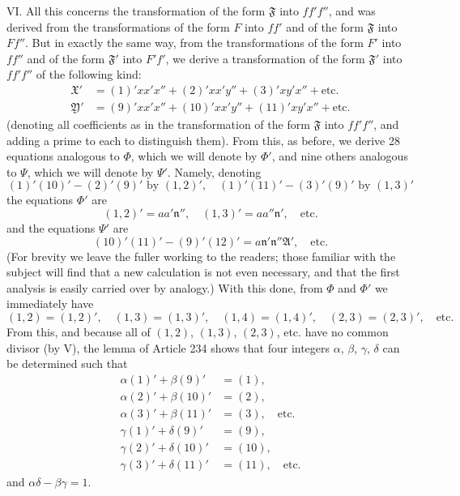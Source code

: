 VI. All this concerns the transformation of the form $\mathfrak{F}$ into $ff'f''$, and was derived from the transformations of the form $F$ into $ff'$ and of the form $\mathfrak{F}$ into $Ff''$. But in exactly the same way, from the transformations of the form $F'$ into $ff''$ and of the form $\mathfrak{F}'$ into $F'f'$, we derive a transformation of the form $\mathfrak{F}'$ into $ff'f''$ of the following kind:
\[
\begin{aligned}
\mathfrak{X}'&=(1)'xx'x''+(2)'xx'y''+(3)'xy'x''+\text{etc.}\\
\mathfrak{Y}'&=(9)'xx'x''+(10)'xx'y''+(11)'xy'x''+\text{etc.}
\end{aligned}
\]
(denoting all coefficients as in the transformation of the form $\mathfrak{F}$ into $ff'f''$, and adding a prime to each to distinguish them). From this, as before, we derive 28 equations analogous to $\Phi$, which we will denote by $\Phi'$, and nine others analogous to $\Psi$, which we will denote by $\Psi'$. Namely, denoting
\[
(1)'(10)'-(2)'(9)'\text{ by }(1,2)',\quad
(1)'(11)'-(3)'(9)'\text{ by }(1,3)'
\]
the equations $\Phi'$ are
\[
(1,2)'=aa'\mathfrak{n}'',\quad (1,3)'=aa''\mathfrak{n}',\quad\text{etc.}
\]
and the equations $\Psi'$ are
\[
(10)'(11)'-(9)'(12)'=a\mathfrak{n}'\mathfrak{n}''\mathfrak{A}',\quad\text{etc.}
\]
(For brevity we leave the fuller working to the readers; those familiar with the subject will find that a new calculation is not even necessary, and that the first analysis is easily carried over by analogy.) With this done, from $\Phi$ and $\Phi'$ we immediately have
\[
(1,2)=(1,2)',\quad (1,3)=(1,3)',\quad (1,4)=(1,4)',\quad (2,3)=(2,3)',\quad\text{etc.}
\]
From this, and because all of $(1,2)$, $(1,3)$, $(2,3)$, etc. have no common divisor (by V), the lemma of Article 234 shows that four integers $\alpha$, $\beta$, $\gamma$, $\delta$ can be determined such that
\[
\begin{aligned}
\alpha(1)'+\beta(9)'&=(1),\\\alpha(2)'+\beta(10)'&=(2),\\\alpha(3)'+\beta(11)'&=(3),\quad\text{etc.}\\
\gamma(1)'+\delta(9)'&=(9),\\\gamma(2)'+\delta(10)'&=(10),\\\gamma(3)'+\delta(11)'&=(11),\quad\text{etc.}
\end{aligned}
\]
and $\alpha\delta-\beta\gamma=1$.


